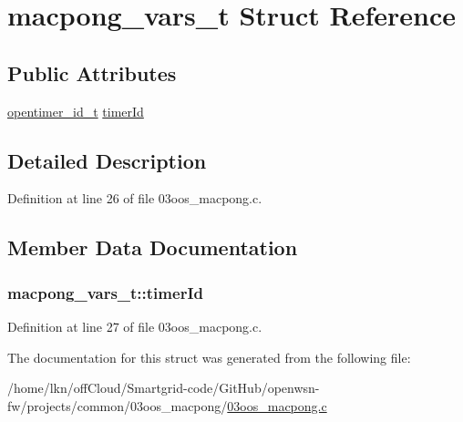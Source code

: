 \hypertarget{structmacpong__vars__t}{}\section{macpong\+\_\+vars\+\_\+t Struct Reference}
\label{structmacpong__vars__t}
\subsection*{Public Attributes}
\begin{DoxyCompactItemize}
\item 
\hyperlink{group___open_timers_gae5ca9e65d270cdfa4bc74008d96d69ab}{opentimer\+\_\+id\+\_\+t} \hyperlink{structmacpong__vars__t_a3ff3a52f3b90704ba080f090466017cf}{timer\+Id}
\end{DoxyCompactItemize}


\subsection{Detailed Description}


Definition at line 26 of file 03oos\+\_\+macpong.\+c.



\subsection{Member Data Documentation}
\subsubsection[{\texorpdfstring{timer\+Id}{timerId}}]{ macpong\+\_\+vars\+\_\+t\+::timer\+Id}\hypertarget{structmacpong__vars__t_a3ff3a52f3b90704ba080f090466017cf}{}\label{structmacpong__vars__t_a3ff3a52f3b90704ba080f090466017cf}


Definition at line 27 of file 03oos\+\_\+macpong.\+c.



The documentation for this struct was generated from the following file\+:\begin{DoxyCompactItemize}
\item 
/home/lkn/off\+Cloud/\+Smartgrid-\/code/\+Git\+Hub/openwsn-\/fw/projects/common/03oos\+\_\+macpong/\hyperlink{03oos__macpong_8c}{03oos\+\_\+macpong.\+c}\end{DoxyCompactItemize}
